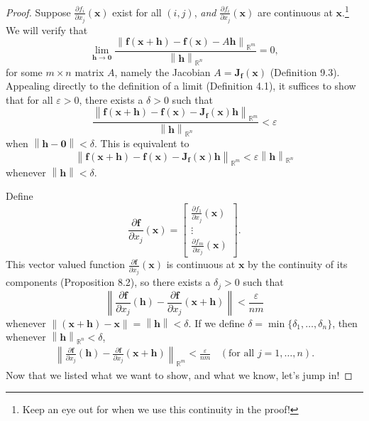 \documentclass{article}
\newcommand{\R}{\mathbb{R}}
\newcommand{\x}{\mathbf{x}}
\newcommand{\f}{\mathbf{f}}
\newcommand{\h}{\mathbf{h}}
\newcommand{\ze}{\mathbf{0}}
\newcommand{\norm}[1]{\left\lVert#1\right\rVert}
\theoremstyle{definition}
\begin{document}
\begin{proof}
	
	
	Suppose $\frac{\partial f_i}{\partial x_j}(\x) $ exist for all $ (i,j) $, \textit{and} $ \frac{\partial f_i}{\partial x_j}(\x) $ are continuous at $ \x $.\footnote{Keep an eye out for when we use this continuity in the proof!} We will verify that
	$$	\lim\limits_{\mathbf h\to \ze}\frac{\norm{\f(\x+\mathbf h) - \f(\x)-A\mathbf{h}}_{\R^m}}{\norm{\mathbf h}_{\R^n}} = 0,$$ for some $ m\times n $ matrix $ A $, namely the Jacobian $ A=\mathbf{J}_\f(\x) $ (Definition 9.3). Appealing directly to the definition of a limit (Definition 4.1), it suffices to show that for all $ \varepsilon > 0 $, there exists a $\delta >0$ such that $$ \frac{\norm{\f(\x+\mathbf h) - \f(\x)-\mathbf{J}_\f(\x) \mathbf{h}}_{\R^m}}{\norm{\mathbf h}_{\R^n}} < \varepsilon$$ when $\norm{\mathbf h - \ze} < \delta $. This is equivalent to\begin{equation}\label{key}
		\norm{\f(\x+\mathbf h) - \f(\x)-\mathbf{J}_\f(\x) \mathbf{h}}_{\R^m} < \varepsilon\norm{\mathbf h}_{\R^n}
	\end{equation} whenever $\norm{\mathbf h} < \delta $.
	
	Define $$ \frac{\partial \f}{\partial x_j}(\x) = \begin{bmatrix}
		\frac{\partial f_1}{\partial x_j}(\x) \\ \vdots \\ 
				\frac{\partial f_m}{\partial x_j}(\x) 
	\end{bmatrix}.$$ This vector valued function $  \frac{\partial \f}{\partial x_j}(\x)  $ is continuous at $ \x $ by the continuity of its components (Proposition 8.2), so there exists a $ \delta_j>0 $ such that $$\norm{ \frac{\partial \f}{\partial x_j}(\h) - \frac{\partial \f}{\partial x_j}(\x+\h) } < \frac{\varepsilon}{nm}$$ whenever $ \norm{(\x + \h)-\x} =\norm{\h} < \delta $. If we define $ \delta = \min\{\delta_1,\ldots, \delta_n\} $, then whenever  $\norm{\h}_{\R^n} < \delta $, 
\begin{align}
	\norm{ \frac{\partial \f}{\partial x_j}(\h) - \frac{\partial \f}{\partial x_j}(\x+\h) }_{\R^m} < \frac{\varepsilon}{nm}  \ \ \ \  (\text{for all } j=1,\ldots,n).
\end{align}
Now that we listed what we want to show, and what we know, let's jump in!


\end{proof}
\end{document}
